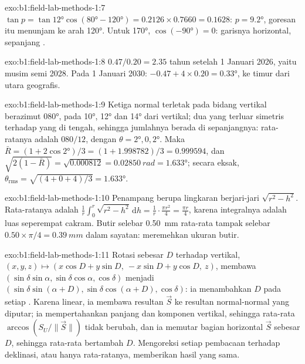 \begin{solution}{exo:b1:field-lab-methods-1:7}
$\tan p = \tan\ang{12}\cos(\ang{80} - \ang{120}) = 0.2126\times0.7660 =
0.1628$: $p = \ang{9.2}$, goresan itu menunjam ke arah \ang{120}. Untuk  \ang{170}, $\cos(\ang{-90}) = 0$: garisnya horizontal, sepanjang .
\end{solution}

\begin{solution}{exo:b1:field-lab-methods-1:8}
$0.47/0.20 = 2.35$ tahun setelah 1 Januari 2026, yaitu musim semi 2028. Pada 1 Januari 2030: $-0.47 + 4\times0.20 = \ang{+0.33}$, ke timur dari utara geografis.
\end{solution}

\begin{solution}{exo:b1:field-lab-methods-1:9}
Ketiga normal terletak pada bidang vertikal berazimut \ang{080}, pada \ang{10}, \ang{12} dan \ang{14} dari vertikal; dua yang terluar simetris terhadap yang di tengah, sehingga jumlahnya berada di sepanjangnya: rata-ratanya adalah $080/12$, dengan $\theta = \ang{2}, 0, \ang{2}$. Maka $\bar R = (1 +
2\cos\ang{2})/3 = (1 + 1.998782)/3 = 0.999594$, dan $\sqrt{2(1 - \bar R)} =
\sqrt{0.000812} = \qty{0.02850}{rad} = \ang{1.633}$; secara eksak,
$\theta_{\text{rms}} = \sqrt{(4 + 0 + 4)/3} = \ang{1.633}$.
\end{solution}

\begin{solution}{exo:b1:field-lab-methods-1:10}
Penampang berupa lingkaran berjari-jari $\sqrt{r^2 - h^2}$. Rata-ratanya adalah
$\frac1r\int_0^r\sqrt{r^2 - h^2}\,\mathrm dh = \frac1r\cdot\frac{\pi r^2}{4}
= \frac{\pi r}{4}$, karena integralnya adalah luas seperempat cakram. Butir selebar \qty{0.50}{mm} rata-rata tampak selebar $0.50\times\pi/4 = \qty{0.39}{mm}$ dalam sayatan:  meremehkan ukuran butir.
\end{solution}

\begin{solution}{exo:b1:field-lab-methods-1:11}
Rotasi sebesar $D$ terhadap vertikal,
$(x, y, z) \mapsto (x\cos D + y\sin D,\ -x\sin D + y\cos D,\ z)$, membawa
$(\sin\delta\sin\alpha, \sin\delta\cos\alpha, \cos\delta)$ menjadi
$(\sin\delta\sin(\alpha + D), \sin\delta\cos(\alpha + D), \cos\delta)$: ia menambahkan $D$ pada setiap . Karena linear, ia membawa resultan $\vec S$ ke resultan normal-normal yang diputar; ia mempertahankan panjang dan komponen vertikal, sehingga  rata-rata $\arccos(S_U/\|\vec S\|)$ tidak berubah, dan ia memutar bagian horizontal $\vec S$ sebesar $D$, sehingga  rata-rata bertambah $D$. Mengoreksi setiap pembacaan terhadap deklinasi, atau hanya rata-ratanya, memberikan hasil yang sama.
\end{solution}

